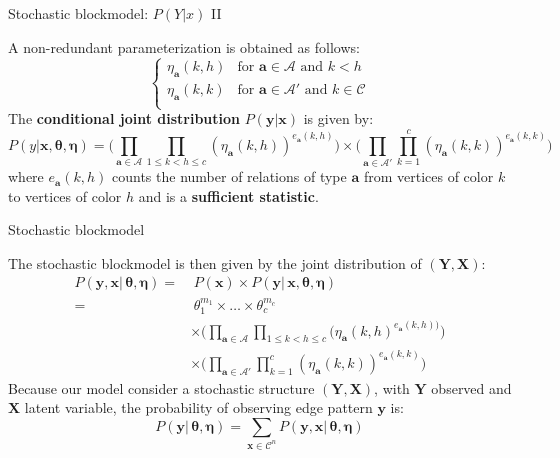 \documentclass[aspectratio=169,xcolor=dvipsnames]{beamer}
\newcommand{\veca}{\boldsymbol{a}}
\newcommand{\seta}{\mathcal{A}}
\newcommand{\setc}{\mathcal{C}}
\newcommand{\vecx}{\textbf{x}}
\newcommand{\vecy}{\textbf{y}}
\newcommand{\matx}{\textbf{X}}
\newcommand{\maty}{\textbf{Y}}
\newcommand{\veceta}{\boldsymbol{\eta}}
\begin{document}
\begin{frame}{Stochastic blockmodel: $P(Y|x)$  II}

    A non-redundant parameterization is obtained as follows:
    $$
    \begin{cases}
      \eta_{\veca}(k,h) & \text{for }\veca\in\seta \text{ and } k<h \\
      \eta_{\veca}(k,k) & \text{for }\veca\in\seta'\text{ and } k \in \setc \\
   \end{cases}
    $$
    \pause
    The \textbf{conditional joint distribution} $P(\vecy|\vecx)$ is given by:
    $$
    P(y|\vecx,\boldsymbol{\theta}, \veceta) =
    \Bigg( \prod_{\veca\in\seta}\prod_{1\leq k<h \leq c}(\eta_{\veca}(k,h))^{e_{\veca}(k, h)} \Bigg) \times
    \Bigg(\prod_{\veca\in\seta'}\prod_{k=1}^c(\eta_{\veca}(k,k))^{e_{\veca}(k, k)}\Bigg)
    $$
    where $e_{\veca}(k, h)$ counts the number of relations  of type $\veca$ from vertices of color $k$ to vertices of color $h$ and is a \textbf{sufficient statistic}.

\end{frame}
\begin{frame}{Stochastic blockmodel}

The stochastic blockmodel is then given by the joint distribution of $(\maty, \matx)$:
    \begin{align*}
        P(\vecy, \vecx|\,\boldsymbol{\theta}, \veceta) = &\hspace{3pt} P(\vecx)\times P(\vecy |\,\vecx, \boldsymbol{\theta}, \veceta) \\
        =& \hspace{3pt} \theta_1^{m_1}  \times \dots \times \theta_c^{m_c} \\
        &\times \Bigg(\prod_{\veca\in\seta}\prod_{1\leq k<h \leq c}(\eta_{\veca}(k,h)^{e_{\veca}(k, h))}\Bigg)\\
        &\times\Bigg(\prod_{\veca\in\seta'}\prod_{k=1}^c(\eta_{\veca}(k,k))^{e_{\veca}(k, k)}\Bigg)
    \end{align*}
\pause
    Because our model consider a stochastic structure $(\maty, \matx)$, with $\maty$ observed and $\matx$ latent variable, the probability of observing edge pattern $\vecy$ is:
    $$
    P(\vecy | \, \boldsymbol{\theta}, \veceta) = \sum_{\vecx \in \setc^n} P(\vecy, \vecx | \, \boldsymbol{\theta}, \veceta)
    $$


\end{frame}
\end{document}
